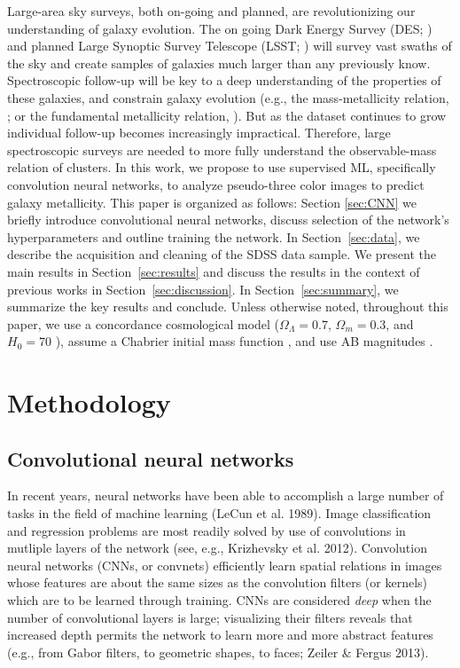 \documentclass[fleqn,usenatbib]{mnras}
\begin{document}
Large-area sky surveys, both on-going and planned, are revolutionizing our understanding of galaxy evolution. The on going Dark Energy Survey (DES; \citealt{DES2005}) and planned Large Synoptic Survey Telescope (LSST; \citealt{LSST2012}) will survey vast swaths of the sky and create samples of galaxies much larger than any previously know. Spectroscopic follow-up will be key to a deep understanding of the properties of these galaxies, and constrain galaxy evolution (e.g., the mass-metallicity relation, \citealt{Tremonti+05}; or the fundamental metallicity relation, \citealt{2010paper,2011paper}). But as the dataset continues to grow individual follow-up becomes increasingly impractical. Therefore, large spectroscopic surveys are needed to more fully understand the observable-mass relation of clusters.
In this work, we propose to use supervised ML, specifically convolution neural networks, to analyze pseudo-three color images to predict galaxy metallicity.
This paper is organized as follows: Section \ref{sec:CNN} we briefly introduce convolutional neural networks, discuss selection of the network's hyperparameters and outline training the network. In Section~\ref{sec:data}, we describe the acquisition and cleaning of the SDSS data sample. We present the main results in Section~\ref{sec:results} and discuss the results in the context of previous works in Section~\ref{sec:discussion}. In Section~\ref{sec:summary}, we summarize the key results and conclude.
Unless otherwise noted, throughout this paper, we use a concordance cosmological model ($\Omega_\Lambda = 0.7$, $\Omega_m = 0.3$, and $H_0= 70$ \kms \mpc), assume a Chabrier initial mass function \citep{Chabrier2003}, and use AB magnitudes \citep{Oke1974}.

\section{Methodology} \label{sec:methodology}

\subsection{Convolutional neural networks}
In recent years, neural networks have been able to accomplish a large number of tasks in the field of machine learning (LeCun et al. 1989).
Image classification and regression problems are most readily solved by use of convolutions in mutliple layers of the network (see, e.g., Krizhevsky et al. 2012).
Convolution neural networks (CNNs, or convnets) efficiently learn spatial relations in images whose features are about the same sizes as the convolution filters (or kernels) which are to be learned through training.
CNNs are considered \textit{deep} when the number of convolutional layers is large; visualizing their filters reveals that increased depth permits the network to learn more and more abstract features (e.g., from Gabor filters, to geometric shapes, to faces; Zeiler \& Fergus 2013).
\end{document}
